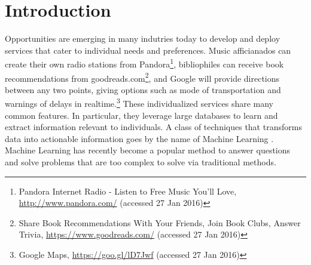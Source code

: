 \documentclass[10pt,letterpaper]{article}
\begin{document}
\section*{Introduction}
\label{sec:introduction}


Opportunities are emerging in many indutries today to develop and deploy services that cater to individual needs and preferences. Music afficianados can create their own radio stations from Pandora\footnote{Pandora Internet Radio - Listen to Free Music You'll Love, \url{http://www.pandora.com/} (accessed 27 Jan 2016)}, bibliophiles can receive 
book recommendations from goodreads.com\footnote{Share Book Recommendations With Your Friends, Join Book Clubs, Answer Trivia, \url{https://www.goodreads.com/} (accessed 27 Jan 2016)}, and Google will provide directions between any two points, giving options such as mode of transportation and warnings of delays in realtime.\footnote{Google Maps, \url{https://goo.gl/lD7Jwf} (accessed 27 Jan 2016)}
These individualized services share many common features. In particular, they leverage large databases to learn and extract information relevant to individuals.  
A class of techniques that transforms data into actionable information goes by the name of Machine Learning \cite{pythonmachinelearning}.
Machine Learning has recently become a popular method to answer questions and solve problems that are too complex to solve via traditional methods. 
\end{document}
